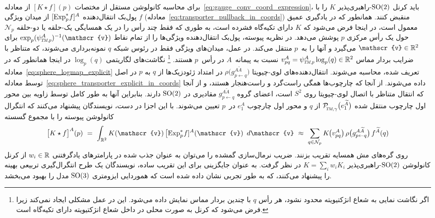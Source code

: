 برای محاسبه کانولوشن مستقل از مختصات $[K \star f](p)$ از معادله~\eqref{eq:gauge_conv_coord_expression}، \citet{kicanaoglu2019gaugeSphere} باید کرنل $\operatorname{SO}(2)$-راهبری‌پذیر $K$ را با پول‌بک انتقال‌دهنده $[\operatorname{Exp}^*_p\mkern-2mu f]^A$ از میدان ویژگی $f$ (معادله~\eqref{eq:transporter_pullback_in_coords}) منقبض کنند.
همانطور که در یادگیری عمیق معمول است، در اینجا فرض می‌شود که $K$ دارای تکیه‌گاه فشرده است، به طوری که فقط چند رأس را در یک همسایگی یک-حلقه یا دو-حلقه $\mathcal{N}_p$ حول یک رأس مرکزی $p$ پوشش می‌دهد.
در نظریه پیوسته، پول‌بک انتقال‌دهنده ویژگی‌ها را از تمام نقاط $\exp_p (\psiTMp^A)^{-1}(\mathscr{v})$ برای $\mathscr{v} \in \R^2$ می‌گیرد و آنها را به~$p$ منتقل می‌کند.
در عمل، میدان‌های ویژگی فقط در رئوس شبکه $q$ نمونه‌برداری می‌شوند، که متناظر با ضرایب بردار مماس $v^A_{pq} = \psiTMp^A \log_p(q) \in \R^2$ نسبت به پیمانه~$A$ در رأس~$p$ هستند.%
\footnote{
	اگر نگاشت نمایی به شعاع انژکتیویته محدود نشود، هر رأس $q$ با چندین بردار مماس نمایش داده می‌شود.
	این در عمل مشکلی ایجاد نمی‌کند زیرا فرض می‌شود که کرنل به صورت محلی در داخل شعاع انژکتیویته دارای تکیه‌گاه است.
}
نگاشت‌های لگاریتمی $\log_p(q)$ در اینجا همانطور که در معادله~\eqref{eq:sphere_logmap_explicit} تعریف شده، محاسبه می‌شوند.
انتقال‌دهنده‌های لوی-چیویتا $\rho\big( g_{p\leftarrow q}^{A\widetilde{A}}\big)$ در امتداد ژئودزیک‌ها از $q$ به $p$ در اصل توسط معادله~\eqref{eq:sphere_transporter_explicit_in_coords} داده می‌شوند.
از آنجا که چارچوب‌ها همگی راست‌گرد و راست‌هنجار هستند، و از آنجا که انتقال متناظر با اتصال لوی-چیویتا روی $S^2$ است، اعضای گروه $g_{p\leftarrow q}^{A\widetilde{A}}$ مقادیری در $\operatorname{SO}(2)$ دارند.
بنابراین آنها به طور کامل توسط زاویه بین محور اول چارچوب منتقل شده $\PTMgamma\big(e_1^{\widetilde{A}}\big)$ از $q$ و محور اول چارچوب $e_1^A$ در~$p$ تعیین می‌شوند.
با این اجزا در دست، نویسندگان پیشنهاد می‌کنند که انتگرال کانولوشن پیوسته را با مجموع گسسته
\begin{align}
	\big[K\star f\big]^A(p)
	\ =\ \int_{\R^2} K(\mathscr{v})\, \big[\!\Expspf]^A(\mathscr{v}) \,\ d\mathscr{v}
	\ \approx\ \sum_{q\in\mathcal{N}_p} K\mkern-1.5mu\big(v^A_{pq}\big)\, \rho\big( g^{A\widetilde{A}}_{p\leftarrow q} \big)\, f^{\widetilde{A}}(q)
\end{align}
روی گره‌های مش همسایه تقریب بزنند.
ضریب نرمال‌سازی گمشده را می‌توان به عنوان جذب شده در پارامترهای یادگرفتنی $w_i \in\mathbb{R}$ از کرنل کانولوشن $\operatorname{SO}(2)$-راهبری‌پذیر $K = \sum_i w_i K_i$ در نظر گرفت.
به عنوان جایگزینی برای این تقریب ساده، نویسندگان یک طرح انتگرال‌گیری تربیعی بهینه را پیشنهاد می‌کنند، که به طور تجربی نشان داده شده است که هموردایی ایزومتری $\operatorname{SO}(3)$ مدل را بهبود می‌بخشد.



